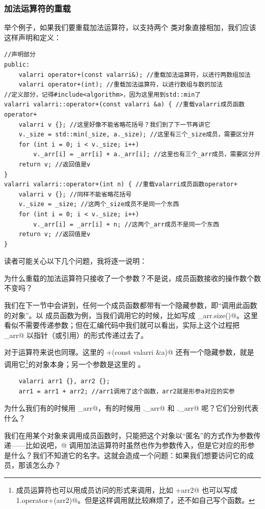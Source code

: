 \subsubsection*{加法运算符的重载}
举个例子，如果我们要重载加法运算符，以支持两个 \lstinline@valarri@ 类对象直接相加，我们应该这样声明和定义：
\begin{lstlisting}
//声明部分
public:
    valarri operator+(const valarri&); //重载加法运算符，以进行两数组加法
    valarri operator+(int); //重载加法运算符，以进行数组与数的加法
//定义部分，记得#include<algorithm>，因为这里用到std::min了
valarri valarri::operator+(const valarri &a) { //重载valarri成员函数operator+
    valarri v {}; //这里好像不能省略花括号？我们到了下一节再讲它
    v._size = std::min(_size, a._size); //这里有三个_size成员，需要区分开
    for (int i = 0; i < v._size; i++)
        v._arr[i] = _arr[i] + a._arr[i]; //这里也有三个_arr成员，需要区分开
    return v; //返回值是v
}
valarri valarri::operator+(int n) { //重载valarri成员函数operator+
    valarri v {}; //同样不能省略花括号
    v._size = _size; //这两个_size成员不是同一个东西
    for (int i = 0; i < v._size; i++)
        v._arr[i] = _arr[i] + n; //这两个_arr成员不是同一个东西
    return v; //返回值是v
}
\end{lstlisting}\pagebreak
读者可能关心以下几个问题，我将逐一说明：\par
{\kaishu 为什么重载的加法运算符只接收了一个参数？不是说，成员函数接收的操作数个数不变吗？}\par
我们在下一节中会讲到，任何一个成员函数都带有一个隐藏参数，即``调用此函数的对象''。以 \lstinline@size@ 成员函数为例，当我们调用它的时候，比如写成 \lstinline@_arr.size()@。这里看似不需要传递参数；但在汇编代码中我们就可以看出，实际上这个过程把 \lstinline@_arr@ 以指针（或引用）的形式传递过去了。\par
对于运算符来说也同理。这里的 \lstinline@valarri+(const valarri &a)@ 还有一个隐藏参数，就是调用它\footnote{成员运算符也可以用成员访问的形式来调用，比如 +arr2@ 也可以写成 \lstinline@arr1.operator+(arr2)@。但是这样调用就比较麻烦了，还不如自己写个函数。}的对象本身；另一个参数是这里的 \lstinline@a@。
\begin{lstlisting}
    valarri arr1 {}, arr2 {};
    arr1 = arr1 + arr2; //arr1调用了这个函数，arr2就是形参a对应的实参
\end{lstlisting}\par
{\kaishu 为什么我们有的时候用 \lstinline@_arr@，有的时候用 \lstinline@v._arr@ 和 \lstinline@a._arr@ 呢？它们分别代表什么？}\par
我们在用某个对象来调用成员函数时，只能把这个对象以``匿名''的方式作为参数传递——比如说吧，@ 调用加法运算符时虽然也作为参数传入，但是它对应的形参是什么？我们不知道它的名字。这就会造成一个问题：如果我们想要访问它的成员，那该怎么办？\par
